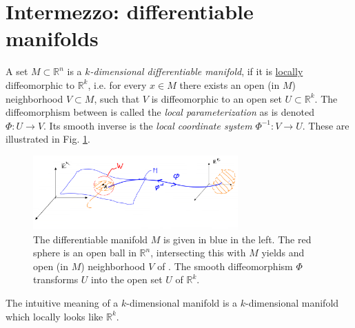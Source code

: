 \section{Intermezzo: differentiable manifolds}
\begin{definition}
	A set $M\subset \mathbb{R}^{n}$ is a \emph{$k$-dimensional differentiable manifold}, if it is \underline{locally} diffeomorphic to $\mathbb{R}^{k}$, i.e. for every $x\in M$ there exists an open (in $M$) neighborhood $V\subset M $, such that $V$ is diffeomorphic to an open set $U \subset \mathbb{R}^{k}$. The diffeomorphism between is called the \emph{local parameterization} as is denoted $\Phi:U \to V$. Its smooth inverse is the \emph{local coordinate system} $\Phi^{-1}:V \to U$. These are illustrated in Fig. \ref{fig:diffble_mfd}.
	\begin{figure}[h!]
		\centering
		\includegraphics[width=0.7\textwidth]{figures/ch9/2diffble_mfd.png}
		\caption{The differentiable manifold $M$ is given in blue in the left. The red sphere is an open ball in  $\mathbb{R}^{n}$, intersecting this with $M$ yields and open (in $M$) neighborhood $V$ of $ $. The smooth diffeomorphism $\Phi $ transforms $U$ into the open set $U$ of $\mathbb{R}^{k}$.}
		\label{fig:diffble_mfd}
	\end{figure}
\end{definition}

The intuitive meaning of a $k$-dimensional manifold is a $k$-dimensional manifold which locally looks like $\mathbb{R}^{k}$.

